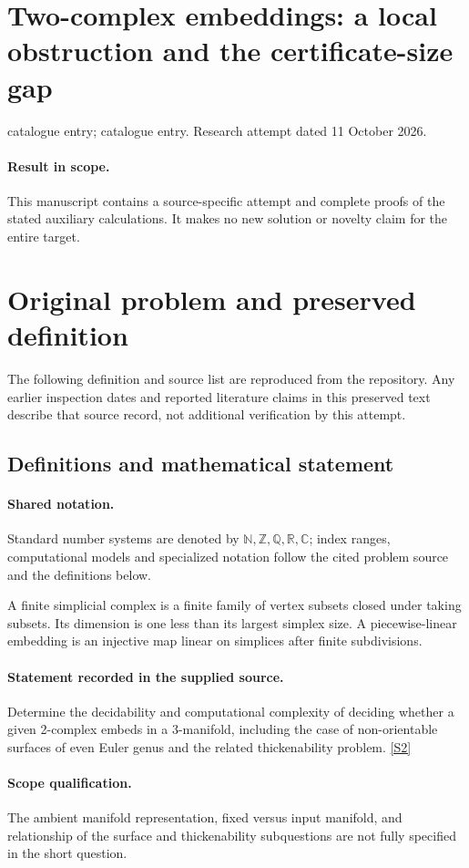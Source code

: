 \documentclass[11pt]{article}
\begin{document}
\section*{Two-complex embeddings: a local obstruction and the certificate-size gap}
\noindent catalogue entry; catalogue entry. Research attempt dated 11 October 2026.
\paragraph{Result in scope.}This manuscript contains a source-specific attempt and complete proofs of the stated auxiliary calculations. It makes no new solution or novelty claim for the entire target.
\section{Original problem and preserved definition}
The following definition and source list are reproduced from the repository. Any earlier inspection dates and reported literature claims in this preserved text describe that source record, not additional verification by this attempt.
\subsection{Definitions and mathematical statement}

\paragraph{Shared notation.}Standard number systems are denoted by $\mathbb N,\mathbb Z,\mathbb Q,\mathbb R,\mathbb C$; index ranges, computational models and specialized notation follow the cited problem source and the definitions below.


A finite simplicial complex is a finite family of vertex subsets closed under taking subsets. Its dimension is one less than its largest simplex size. A piecewise-linear embedding is an injective map linear on simplices after finite subdivisions.
\paragraph{Statement recorded in the supplied source.}
Determine the decidability and computational complexity of deciding whether a given 2-complex embeds in a 3-manifold, including the case of non-orientable surfaces of even Euler genus and the related thickenability problem. \href{https://doi.org/10.4171/owr/2015/45}{[S2]}
\paragraph{Scope qualification.}
The ambient manifold representation, fixed versus input manifold, and relationship of the surface and thickenability subquestions are not fully specified in the short question.
\end{document}
